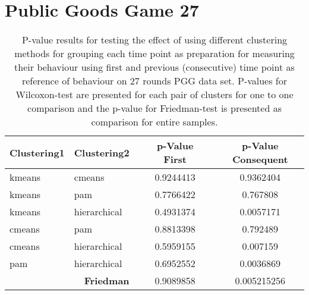 \section{Public Goods Game 27}

\begin{table}[H]
	\centering
	\caption{P-value results for testing the effect of using different clustering methods for grouping each time point as preparation  for measuring their behaviour using first and previous (consecutive) time point as reference of behaviour on 27 rounds PGG data set. P-values for Wilcoxon-test are presented for each pair of clusters for one to one comparison and the p-value for Friedman-test is presented as comparison for entire samples.}
	\label{tab:Pvalue27PGGClusterDiff}
	\begin{tabular}{@{}llcccc@{}}\toprule
		Clustering1              & Clustering2       &\phantom{abc}        & p-Value First   &\phantom{abc}  & p-Value Consequent \\ \midrule

			kmeans & cmeans &		\phantom{abc}  &  0.9244413  &\phantom{abc}  &  0.9362404 \\
			kmeans & pam &			\phantom{abc}  &  0.7766422  &\phantom{abc}  &  0.767808\\
			kmeans & hierarchical &	\phantom{abc}  &  0.4931374  &\phantom{abc}  &  0.0057171\\
			cmeans & pam &			\phantom{abc}  &  0.8813398  &\phantom{abc}  &  0.792489\\
			cmeans & hierarchical &	\phantom{abc}  &  0.5959155  &\phantom{abc}  &  0.007159\\
			pam & hierarchical &	\phantom{abc}  &  0.6952552  &\phantom{abc}  &  0.0036869\\ \hline
			\multicolumn{2}{r}{\textbf{Friedman}}&\phantom{abc}  &  0.9089858  &\phantom{abc}  &  0.005215256\\
		\bottomrule     
	\end{tabular}
\end{table}



